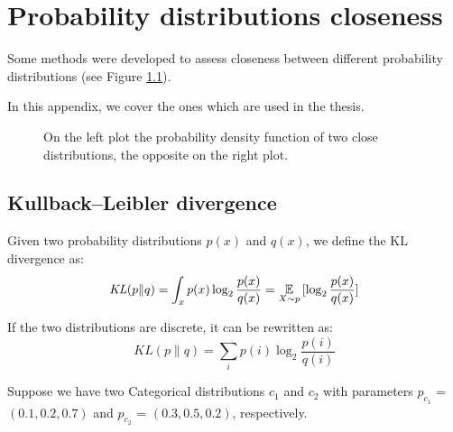 \chapter{Probability distributions closeness}
Some methods were developed to assess closeness between different probability distributions (see Figure \ref{fig:diffkl}).

In this appendix, we cover the ones which are used in the thesis.

\begin{figure}[h]
    \centering
    \hfill
    \caption{On the left plot the probability density function of two close distributions, the opposite on the right plot.}
    \label{fig:diffkl}
\end{figure}

\section{Kullback–Leibler divergence}
Given two probability distributions $p(x)$ and $q(x)$, we define the KL divergence as:
$$ \mathit{KL}(p \| q) = \int_x p(x) \log_2 \frac{p(x)}{q(x)} = \operatorname*{\mathbb{E}}_{X \sim p}{[\log_2 \frac{p(x)}{q(x)}]}$$

If the two distributions are discrete, it can be rewritten as:
$$ \mathit{KL}(p \| q) = \sum_i p(i) \log_2 \frac{p(i)}{q(i)}$$

Suppose we have two Categorical distributions $c_1$ and $c_2$ with parameters $p_{c_1}$ = $(0.1, 0.2, 0.7)$ and $p_{c_2}$ = $(0.3, 0.5, 0.2)$, respectively.

